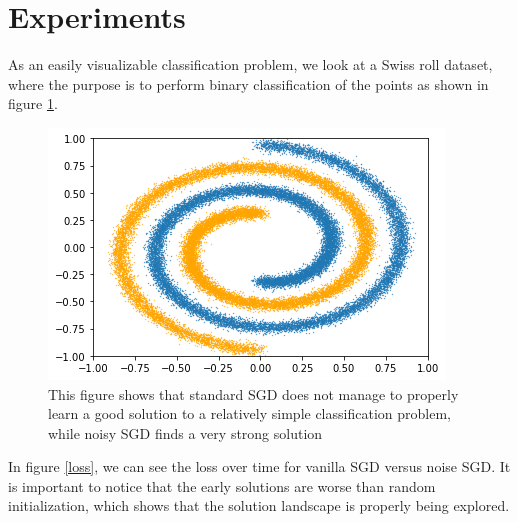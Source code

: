 \documentclass[twocolumn]{article}
\begin{document}
\section{Experiments}
As an easily visualizable classification problem, we look at a Swiss roll dataset, where the purpose is to perform binary classification of the points as shown in figure \ref{swiss_roll}.
\begin{figure}[ht!]
\begin{center}
  \centerline{\includegraphics[width=\columnwidth]{src/swiss_roll.png}}
\caption{This figure shows that standard SGD does not manage to properly learn a good solution to a relatively simple classification problem, while noisy SGD finds a very strong solution}
\label{swiss_roll}
\end{center}
\vskip -0.2in
\end{figure}

In figure \ref{loss}, we can see the loss over time for vanilla SGD versus noise SGD. It is important to notice that the early solutions are worse than random initialization, which shows that the solution landscape is properly being explored.
\end{document}
